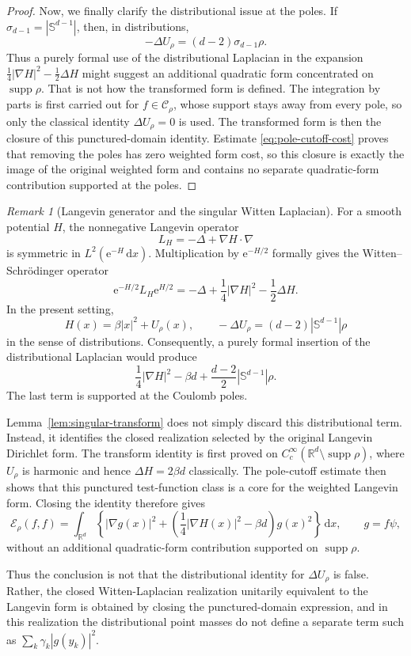 \documentclass[12pt,reqno,letterpaper]{amsart}
\theoremstyle{definition}
\theoremstyle{remark}
\newtheorem{remark}[theorem]{Remark}
\numberwithin{equation}{section}
\newcommand{\R}{\mathbb R}
\newcommand{\dd}{\,\mathrm d}
\newcommand{\ee}{\mathrm e}
\newcommand{\be}{\beta}
\newcommand{\cE}{\mathcal E}
\begin{document}
\begin{proof}
Now, we finally clarify the distributional issue at the poles.  If
\(\sigma_{d-1}=|\mathbb S^{d-1}|\), then, in distributions,
\[
 -\Delta U_\rho=(d-2)\sigma_{d-1}\rho.
\]
Thus a purely formal use of the distributional Laplacian in the expansion
\(\frac14|\nabla H|^2-\frac12\Delta H\) might suggest an additional
quadratic form concentrated on \(\operatorname{supp}\rho\).  That is not how
the transformed form is defined.  The integration by parts is first carried
out for \(f\in\mathcal C_\rho\), whose support stays away from every pole, so
only the classical identity \(\Delta U_\rho=0\) is used.  The transformed
form is then the closure of this punctured-domain identity.  Estimate
\eqref{eq:pole-cutoff-cost} proves that removing the poles has zero weighted
form cost, so this closure is exactly the image of the original weighted
form and contains no separate quadratic-form contribution supported at the
poles.
\end{proof}

\begin{remark}[Langevin generator and the singular Witten Laplacian]
For a smooth potential \(H\), the nonnegative Langevin operator
\[
 L_H=-\Delta+\nabla H\cdot\nabla
\]
is symmetric in \(L^2(\ee^{-H}\dd x)\).  Multiplication by
\(\ee^{-H/2}\) formally gives the Witten--Schr\"odinger operator
\[
 \ee^{-H/2}L_H\ee^{H/2}
 =
 -\Delta+\frac14|\nabla H|^2-\frac12\Delta H.
\]
In the present setting,
\[
 H(x)=\be|x|^2+U_\rho(x),
 \qquad
 -\Delta U_\rho=(d-2)|\mathbb S^{d-1}|\rho
\]
in the sense of distributions.  Consequently, a purely formal insertion
of the distributional Laplacian would produce
\[
 \frac14|\nabla H|^2-\be d
 +\frac{d-2}{2}|\mathbb S^{d-1}|\rho.
\]
The last term is supported at the Coulomb poles.

Lemma~\ref{lem:singular-transform} does not simply discard this
distributional term.  Instead, it identifies the closed realization selected
by the original Langevin Dirichlet form.  The transform identity is first
proved on $C_c^\infty(\R^d\setminus\operatorname{supp}\rho)$,
where \(U_\rho\) is harmonic and hence
\(\Delta H=2\be d\) classically.  The pole-cutoff estimate then shows that
this punctured test-function class is a core for the weighted Langevin form.
Closing the identity therefore gives
\[
 \cE_\rho(f,f)
 =
 \int_{\R^d}
 \left\{
 |\nabla g(x)|^2+
 \left(\frac14|\nabla H(x)|^2-\be d\right)g(x)^2
 \right\}\dd x,
 \qquad g=f\psi,
\]
without an additional quadratic-form contribution supported on
\(\operatorname{supp}\rho\).

Thus the conclusion is not that the distributional identity for
\(\Delta U_\rho\) is false.  Rather, the closed Witten-Laplacian realization
unitarily equivalent to the Langevin form is obtained by closing the
punctured-domain expression, and in this realization the distributional
point masses do not define a separate term such as
\(\sum_k\gamma_k|g(y_k)|^2\).
\end{remark}
\end{document}
